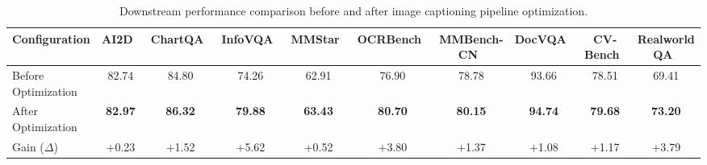 \begin{table}[t]
\centering
\caption{Downstream performance comparison before and after image captioning pipeline optimization.}
\label{tab:caption_results}
\vspace{0.5em}
\begin{adjustbox}{max width=\textwidth}
\begin{tabular}{lccccccccc}
\toprule
\textbf{Configuration} & \textbf{AI2D}~\cite{bench_ai2d} & \textbf{ChartQA}~\cite{bench_chartqa} & \textbf{InfoVQA}~\cite{bench_infographicvqa} & \textbf{MMStar}~\cite{bench_mmstar} & \textbf{OCRBench}~\cite{bench_ocrbench} & \textbf{MMBench-CN}~\cite{bench_mmbench} & \textbf{DocVQA}~\cite{bench_docvqa} & \textbf{CV-Bench}~\cite{cambrian} & \textbf{Realworld QA}~\cite{bench_realworldqa} \\
\midrule
Before Optimization & 82.74 & 84.80 & 74.26 & 62.91 & 76.90 & 78.78 & 93.66 & 78.51 & 69.41 \\
After Optimization  & \textbf{82.97} & \textbf{86.32} & \textbf{79.88} & \textbf{63.43} & \textbf{80.70} & \textbf{80.15} & \textbf{94.74} & \textbf{79.68} & \textbf{73.20} \\
\midrule
Gain ($\Delta$)     & +0.23 & +1.52 & +5.62 & +0.52 & +3.80 & +1.37 & +1.08 & +1.17 & +3.79 \\
\bottomrule
\end{tabular}%
\end{adjustbox}
\end{table}
